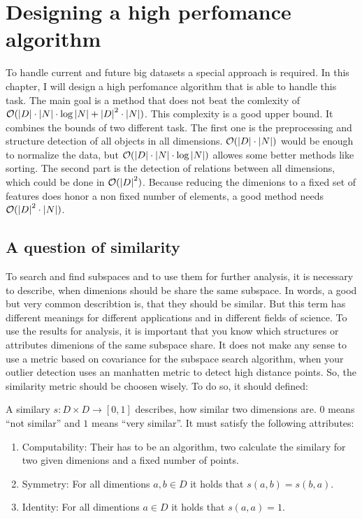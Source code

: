 \chapter{Designing a high perfomance algorithm}\label{chap:algodesign}
To handle current and future big datasets a special approach is required. In this chapter, I will design a high perfomance algorithm that is able to handle this task. The main goal is a method that does not beat the comlexity of $\mathcal{O} ( \left|D\right| \cdot \left|N\right| \cdot \log{\left|N\right|} + \left|D\right|^2 \cdot \left|N\right| )$. This complexity is a good upper bound. It combines the bounds of two different task. The first one is the preprocessing and structure detection of all objects in all dimensions. $\mathcal{O} ( \left|D\right| \cdot \left|N\right| )$ would be enough to normalize the data, but $\mathcal{O} ( \left|D\right| \cdot \left|N\right| \cdot \log{\left|N\right|} )$ allowes some better methods like sorting. The second part is the detection of relations between all dimensions, which could be done in $\mathcal{O} ( \left|D\right|^2 )$. Because reducing the dimenions to a fixed set of features does honor a non fixed number of elements, a good method needs $\mathcal{O} ( \left|D\right|^2 \cdot \left|N\right| )$.

\section{A question of similarity}
To search and find subspaces and to use them for further analysis, it is necessary to describe, when dimenions should be share the same subspace. In words, a good but very common describtion is, that they should be similar. But this term has different meanings for different applications and in different fields of science. To use the results for analysis, it is important that you know which structures or attributes dimenions of the same subspace share. It does not make any sense to use a metric based on covariance for the subspace search algorithm, when your outlier detection uses an manhatten metric to detect high distance points. So, the similarity metric should be choosen wisely. To do so, it should defined:

\begin{envdef}[Similarity]
	A similary $s : D \times D \rightarrow [0,1]$ describes, how similar two dimensions are. $0$ means ``not similar'' and $1$ means ``very similar''. It must satisfy the following attributes:
	\begin{enumerate}
		\item Computability: Their has to be an algorithm, two calculate the similary for two given dimenions and a fixed number of points.
		\item Symmetry: For all dimentions $a,b \in D$ it holds that $s(a,b) = s(b,a)$.
		\item Identity: For all dimentions $a \in D$ it holds that $s(a,a) = 1$.
	\end{enumerate}
\end{envdef}


